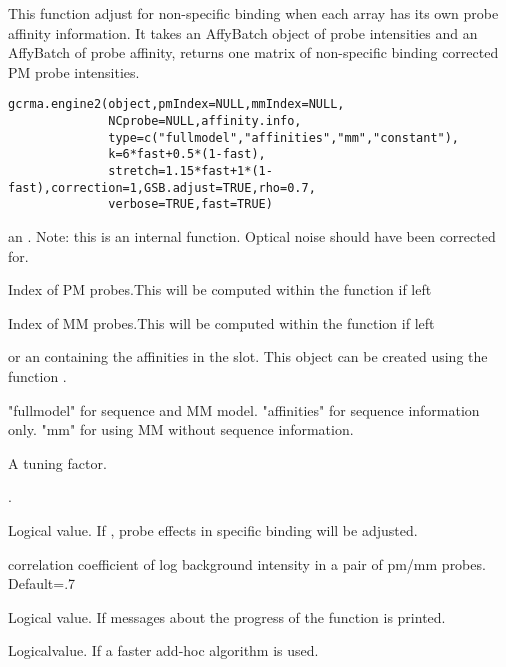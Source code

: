 \begin{Description}\relax
This function adjust for non-specific binding when each array has its
own probe affinity information. It takes an AffyBatch object of probe
intensities and an AffyBatch of probe  affinity,
returns one matrix of non-specific binding corrected PM probe intensities.
\end{Description}
\begin{Usage}
\begin{verbatim}
gcrma.engine2(object,pmIndex=NULL,mmIndex=NULL,
              NCprobe=NULL,affinity.info,
              type=c("fullmodel","affinities","mm","constant"),
              k=6*fast+0.5*(1-fast),
              stretch=1.15*fast+1*(1-fast),correction=1,GSB.adjust=TRUE,rho=0.7,
              verbose=TRUE,fast=TRUE)
\end{verbatim}
\end{Usage}
\begin{Arguments}
\begin{ldescription}
\item[\code{object}] an . Note: this is an internal
function. Optical noise should have been corrected for. 
\item[\code{pmIndex}] Index of PM probes.This will be computed within the
function if left 
\item[\code{mmIndex}] Index of MM probes.This will be computed within the
function if left 
\item[\code{NCprobe}] 
\item[\code{affinity.info}]  or an  containing the
affinities in the  slot. This object can be created
using the function .
\item[\code{type}] "fullmodel" for sequence and MM model. "affinities" for
sequence information only. "mm" for using MM without sequence
information.
\item[\code{k}] A tuning factor.
\item[\code{stretch}] 
\item[\code{correction}] .
\item[\code{GSB.adjust}] Logical value. If , probe effects in specific binding will
be adjusted.
\item[\code{rho}] correlation coefficient of log background intensity in a pair of pm/mm probes. Default=.7
\item[\code{verbose}] Logical value. If  messages about the progress of
the function is printed.
\item[\code{fast}] Logicalvalue. If  a faster add-hoc algorithm is
used.
\end{ldescription}
\end{Arguments}
